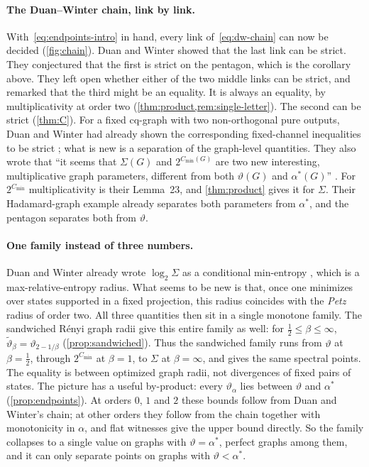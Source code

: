 \documentclass[11pt]{article}
\theoremstyle{definition}
\newcommand{\vt}{\vartheta}
\newcommand{\Cmin}{C_{\min}}
\begin{document}
\paragraph{The Duan--Winter chain, link by link.}
With~\eqref{eq:endpoints-intro} in hand, every link of~\eqref{eq:dw-chain}
can now be decided (\cref{fig:chain}).  Duan and Winter showed that the last
link can be strict.  They conjectured that the first is strict on the
pentagon, which is the corollary above.  They left open whether either of the
two middle links can be strict, and remarked that the third might be an
equality.  It is always an equality, by multiplicativity at order two
(\cref{thm:product,rem:single-letter}).  The second
can be strict (\cref{thm:C}).  For a fixed cq-graph with two non-orthogonal
pure outputs, Duan and Winter had already shown the corresponding
fixed-channel inequalities to be strict \cite[Section~IV.D]{DuanWinter2016};
what is new is a separation of the graph-level quantities.  They also wrote
that ``it seems that
$\Sigma(G)$ and $2^{\Cmin(G)}$ are two new interesting, multiplicative graph
parameters, different from both $\vt(G)$ and $\alpha^*(G)$''
\cite[Section~VII]{DuanWinter2016}.  For $2^{\Cmin}$ multiplicativity is their
Lemma~23, and \cref{thm:product} gives it for $\Sigma$.  Their Hadamard-graph
example already separates both parameters from $\alpha^*$, and the pentagon
separates both from $\vt$.

\paragraph{One family instead of three numbers.}
Duan and Winter already wrote $\log_2\Sigma$ as a conditional min-entropy
\cite[Theorem~2]{DuanWinter2016}, which is a max-relative-entropy radius.
What seems to be new is that, once
one minimizes over states supported in a fixed projection, this radius
coincides with the \emph{Petz} radius of order two.  All three quantities then
sit in a single monotone family.  The sandwiched R\'enyi graph radii give
this entire family as well: for $\frac12\le\beta\le\infty$,
$\widetilde\vt_\beta=\vt_{2-1/\beta}$ (\cref{prop:sandwiched}).  Thus the
sandwiched family runs from $\vt$ at $\beta=\frac12$, through $2^{\Cmin}$
at $\beta=1$, to $\Sigma$ at $\beta=\infty$, and gives the same spectral
points.  The equality is between optimized graph radii, not divergences of
fixed pairs of states.  The picture has a useful by-product: every
$\vt_\alpha$ lies between $\vt$ and $\alpha^*$ (\cref{prop:endpoints}).  At
orders $0$, $1$ and $2$ these bounds follow from Duan and Winter's chain; at
other orders they follow from the chain together with monotonicity in
$\alpha$, and flat witnesses give the upper bound directly.  So the family
collapses to a single value on graphs
with $\vt=\alpha^*$, perfect graphs among them, and it can only separate
points on graphs with $\vt<\alpha^*$.
\end{document}
